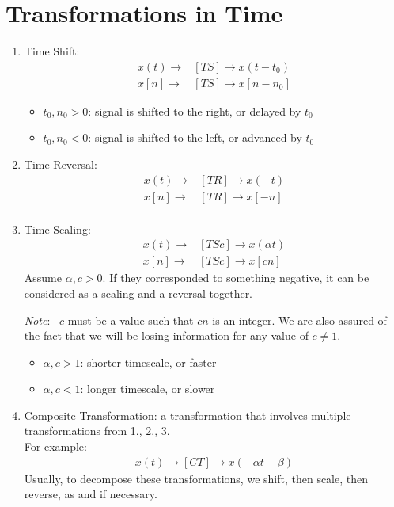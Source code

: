 \documentclass[nobib]{tufte-handout}
\newcommand{\note}[1]{
        \begin{notebox}
        \noindent\textit{Note}:\ #1
        \end{notebox}
}
\begin{document}
\section{Transformations in Time}
\begin{enumerate}
    \item Time Shift:
          \begin{align*}
              x(t) \rightarrow & [TS] \rightarrow x(t-t_0) \\
              x[n] \rightarrow & [TS] \rightarrow x[n-n_0]
          \end{align*}
          \begin{itemize}
              \item $t_0,n_0>0$: signal is shifted to the right, or delayed by $t_0$
              \item $t_0, n_0<0$: signal is shifted to the left, or advanced by $t_0$
          \end{itemize}
    \item Time Reversal:
          \begin{align*}
              x(t)\rightarrow & [TR]\rightarrow x(-t) \\
              x[n]\rightarrow & [TR]\rightarrow x[-n] \\
          \end{align*}
    \item Time Scaling:
          \begin{align*}
              x(t)\rightarrow & [TSc]\rightarrow x(\alpha t) \\
              x[n]\rightarrow & [TSc]\rightarrow x[c n]
          \end{align*}
          Assume $\alpha, c >0$. If they corresponded to something negative, it can be considered as a scaling and a reversal together.\\
          \note{ $c$ must be a value such that $cn$ is an integer. We are also assured of the fact that we will be losing information for any value of $c\neq 1$.}
          \begin{itemize}
              \item $\alpha, c >1$: shorter timescale, or faster
              \item $\alpha, c <1$: longer timescale, or slower
          \end{itemize}
    \item Composite Transformation: a transformation that involves multiple
          transformations from 1., 2., 3.\\ For example:
          \begin{align*}
              x(t)\rightarrow[CT]\rightarrow x(-\alpha t + \beta)
          \end{align*}
          Usually, to decompose these transformations, we shift, then scale, then reverse, as and if necessary.
\end{enumerate}
\end{document}
